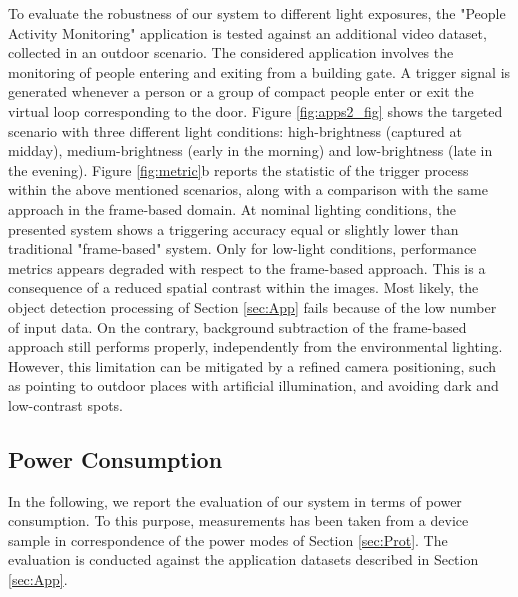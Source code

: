 \documentclass[journal]{IEEEtran}
\begin{document}
To evaluate the robustness of our system to different light exposures, the "People Activity Monitoring" application is tested against an additional video dataset, collected in an outdoor scenario. The considered application involves the monitoring of people entering and exiting from a building gate. A trigger signal is generated whenever a person or a group of compact people enter or exit the virtual loop corresponding to the door. Figure \ref{fig:apps2_fig} shows the targeted scenario with three different light conditions: high-brightness (captured at midday), medium-brightness (early in the morning) and low-brightness (late in the evening). Figure  \ref{fig:metric}b reports the statistic of the trigger process within the above mentioned scenarios, along with a comparison with the same approach in the frame-based domain.
At nominal lighting conditions, the presented system shows a triggering accuracy equal or slightly lower than traditional "frame-based" system. Only for low-light conditions, performance metrics appears degraded with respect to the frame-based approach. This is a consequence of a reduced spatial contrast within the images. Most likely, the object detection processing of Section \ref{sec:App} fails because of the low number of input data. On the contrary, background subtraction of the frame-based approach still performs properly, independently from the environmental lighting. However, this limitation can be mitigated by a refined camera positioning, such as pointing to outdoor places with artificial illumination, and avoiding dark and low-contrast spots. 







\subsection{Power Consumption}
In the following, we report the evaluation of our system in terms of power consumption. To this purpose, measurements has been taken from a device sample in correspondence of the power modes of Section \ref{sec:Prot}. The evaluation is conducted against the application datasets described in Section \ref{sec:App}.
\end{document}
